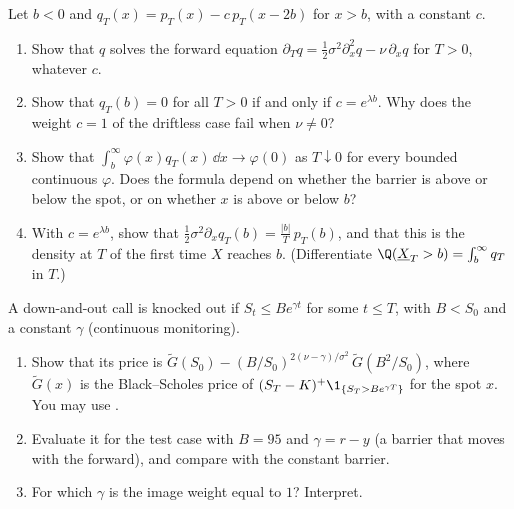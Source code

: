 \begin{exercise}\label{ex:bar-pde}
\easy Let $b<0$ and $q_T(x)=p_T(x)-c\,p_T(x-2b)$ for $x>b$, with a constant $c$.
\begin{enumerate}[label=(\alph*)]
  \item Show that $q$ solves the forward equation $\partial_Tq=\frac12\sigma^2\partial_x^2q-\nu\,\partial_xq$
    for $T>0$, whatever $c$.
  \item Show that $q_T(b)=0$ for all $T>0$ if and only if $c=e^{\lambda b}$. Why does the weight
    $c=1$ of the driftless case fail when $\nu\ne0$?
  \item Show that $\int_b^\infty\varphi(x)q_T(x)\,\dd x\to\varphi(0)$ as $T\downarrow0$ for every bounded continuous
    $\varphi$. Does the formula depend on whether the barrier is above or below the spot, or on
    whether $x$ is above or below $b$?
  \item With $c=e^{\lambda b}$, show that $\frac12\sigma^2\partial_xq_T(b)=\frac{|b|}{T}\,p_T(b)$, and that this is
    the density at $T$ of the first time $X$ reaches $b$. (Differentiate
    $\Q(\underline X_T>b)=\int_b^\infty q_T$ in $T$.)
\end{enumerate}
\end{exercise}

\begin{exercise}\label{ex:bar-moving}
\medium A down-and-out call is knocked out if $S_t\le Be^{\gamma t}$ for some $t\le T$, with $B<S_0$
and a constant $\gamma$ (continuous monitoring).
\begin{enumerate}[label=(\alph*)]
  \item Show that its price is $\widetilde G(S_0)-(B/S_0)^{2(\nu-\gamma)/\sigma^2}\,\widetilde G(B^2/S_0)$, where
    $\widetilde G(x)$ is the Black--Scholes price of $(S_T-K)^+\1_{\{S_T>Be^{\gamma T}\}}$ for the spot $x$. You may use
    .
  \item Evaluate it for the test case with $B=95$ and $\gamma=r-y$ (a barrier that moves with the
    forward), and compare with the constant barrier.
  \item For which $\gamma$ is the image weight equal to $1$? Interpret.
\end{enumerate}
\end{exercise}

